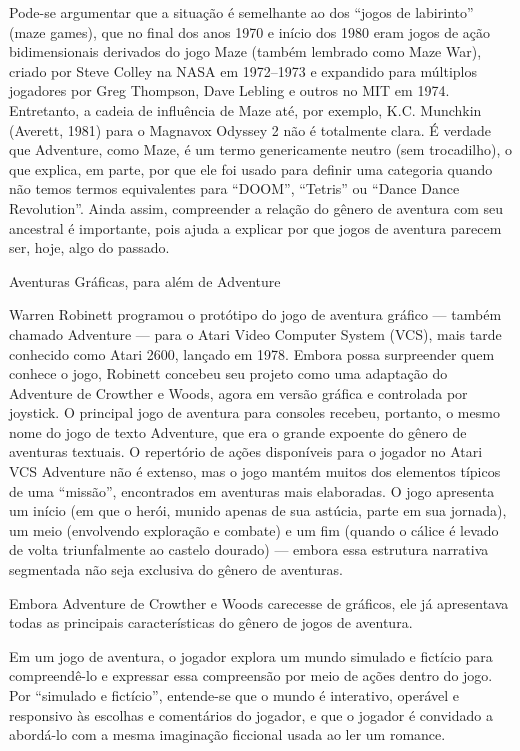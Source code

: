 \documentclass[12pt,a4paper]{article}
\begin{document}
Pode-se argumentar que a situação é semelhante ao dos “jogos de labirinto” (maze games), que no final dos anos 1970 e início dos 1980 eram jogos de ação bidimensionais derivados do jogo Maze (também lembrado como Maze War), criado por Steve Colley na NASA em 1972–1973 e expandido para múltiplos jogadores por Greg Thompson, Dave Lebling e outros no MIT em 1974. Entretanto, a cadeia de influência de Maze até, por exemplo, K.C. Munchkin (Averett, 1981) para o Magnavox Odyssey 2 não é totalmente clara. É verdade que Adventure, como Maze, é um termo genericamente neutro (sem trocadilho), o que explica, em parte, por que ele foi usado para definir uma categoria quando não temos termos equivalentes para “DOOM”, “Tetris” ou “Dance Dance Revolution”.
Ainda assim, compreender a relação do gênero de aventura com seu ancestral é importante, pois ajuda a explicar por que jogos de aventura parecem ser, hoje, algo do passado.

Aventuras Gráficas, para além de Adventure

Warren Robinett programou o protótipo do jogo de aventura gráfico — também chamado Adventure — para o Atari Video Computer System (VCS), mais tarde conhecido como Atari 2600, lançado em 1978. Embora possa surpreender quem conhece o jogo, Robinett concebeu seu projeto como uma adaptação do Adventure de Crowther e Woods, agora em versão gráfica e controlada por joystick.
O principal jogo de aventura para consoles recebeu, portanto, o mesmo nome do jogo de texto Adventure, que era o grande expoente do gênero de aventuras textuais. O repertório de ações disponíveis para o jogador no Atari VCS Adventure não é extenso, mas o jogo mantém muitos dos elementos típicos de uma “missão”, encontrados em aventuras mais elaboradas.
O jogo apresenta um início (em que o herói, munido apenas de sua astúcia, parte em sua jornada), um meio (envolvendo exploração e combate) e um fim (quando o cálice é levado de volta triunfalmente ao castelo dourado) — embora essa estrutura narrativa segmentada não seja exclusiva do gênero de aventuras.

Embora Adventure de Crowther e Woods carecesse de gráficos, ele já apresentava todas as principais características do gênero de jogos de aventura.

Em um jogo de aventura, o jogador explora um mundo simulado e fictício para compreendê-lo e expressar essa compreensão por meio de ações dentro do jogo.
Por “simulado e fictício”, entende-se que o mundo é interativo, operável e responsivo às escolhas e comentários do jogador, e que o jogador é convidado a abordá-lo com a mesma imaginação ficcional usada ao ler um romance.
\end{document}
